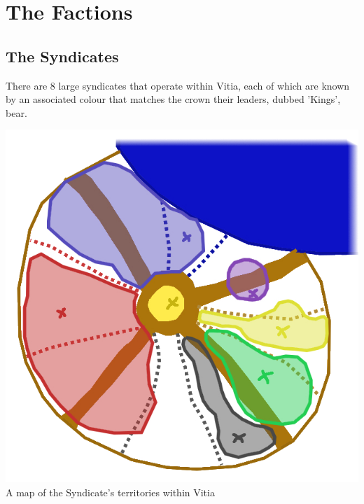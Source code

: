 \documentclass{article}
\newenvironment{Figure}
  {\par\medskip\noindent\minipage{\linewidth}}
  {\endminipage\par\medskip}
\begin{document}
\section{The Factions}
\begin{multicols}{2}
\subsection{The Syndicates}
There are 8 large syndicates that operate within Vitia, each of which are known by an associated colour that matches the crown their leaders, dubbed 'Kings', bear.

\begin{Figure}
\centering
\includegraphics[width=\linewidth]{Gangs.png}
A map of the Syndicate's territories within Vitia
\end{Figure}
\vbox{
}
\end{multicols}
\end{document}
